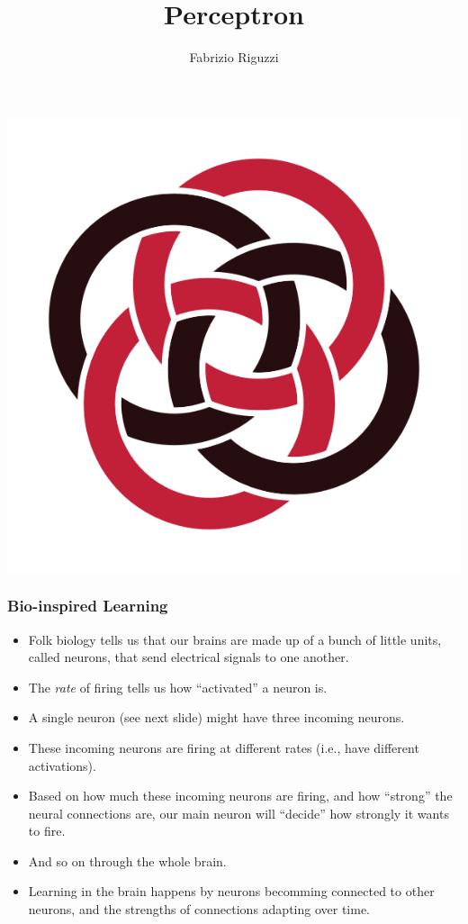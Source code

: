 \documentclass[trans]{beamer}
\title[Perceptron]
{Perceptron}
\author[F. Riguzzi] %
{Fabrizio Riguzzi}
\institute[] %
{
}
\date{}
\newcommand{\myalert}[1]{{%
 #1}}
\begin{document}
\begin{frame}
\titlepage 
\vspace{-2cm}
\begin{center}
\includegraphics[scale=0.280]{Twisted_rings.png}
\end{center}
\end{frame}
  \renewcommand{\concept}[1]{\myalert{#1}}
  \renewcommand{\koncept}[2]{\myalert{#1}}

\renewcommand{\Figure}[3]{%
    \begin{center}
    \texttt{[image: ../book/figs/\#1]}
    \end{center}
  }
  
\begin{frame}
  \frametitle{Bio-inspired Learning}
\begin{itemize}
\item Folk biology tells us that our brains are made up of a bunch of little
units, called \concept{neurons}, that send electrical signals to one
another.  
\item The \emph{rate} of firing tells us how ``activated'' a
neuron is. 
\item  A single neuron (see next slide) might have three incoming neurons. 
\item These
incoming neurons are firing at different rates (i.e., have different
\concept{activations}). 
\item Based on how much these incoming neurons are
firing, and how ``strong'' the neural connections are, our main neuron
will ``decide'' how strongly it wants to fire.
\item   And so on through the
whole brain. 
\item Learning in the brain happens by neurons becomming
connected to other neurons, and the strengths of connections adapting
over time.
\end{itemize}
\end{frame}
\end{document}

